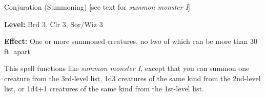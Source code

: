
Conjuration (Summoning) [see text for \textit{summon monster I}]

\textbf{Level:} Brd 3, Clr 3, Sor/Wiz 3

\textbf{Effect:} One or more summoned creatures, no two of which can be more than 
30 ft. apart

This spell functions like \textit{summon monster I}, except that you can summon 
one creature from the 3rd-level list, 1d3 creatures of the same kind from the 2nd-level 
list, or 1d4+1 creatures of the same kind from the 1st-level list.

